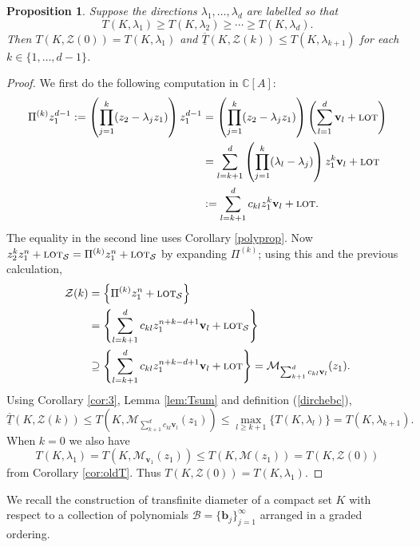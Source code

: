 \documentclass[12pt]{article}
\numberwithin{equation}{section}
\newtheorem{proposition}[theorem]{Proposition}
\newcommand{\C}{\mathbb{C}}
\newcommand{\calM}{\mathcal{M}}
\newcommand{\lot}{\text{\sc lot}}
\newcommand{\calZ}{\mathcal{Z}}
\newcommand{\calB}{\mathcal{B}}
\newcommand{\calS}{\mathcal{S}}
\newcommand{\bv}{\mathbf{v}}
\newcommand{\bb}{\mathbf{b}}
\begin{document}
\begin{proposition}\label{prop:TZ}
Suppose the directions $\lambda_1,\ldots,\lambda_d$ are labelled so that 
$$T(K,\lambda_1)\geq T(K,\lambda_2) \geq\cdots\geq T(K,\lambda_d) .$$ Then  %
$T(K,\calZ(0))=T(K,\lambda_1)$ and  $\overline{\underline T}(K,\calZ(k))\leq T(K,\lambda_{k+1})$ for each $k\in\{1,\ldots,d-1\}$.  
\end{proposition}


\begin{proof}
We first do the following computation in $ \C[A]$:
$$\begin{aligned}
\Pi^{(k)} z_1^{d-1}:=\left(\prod_{j=1}^{k} (z_2-\lambda_j z_1)\right)z_1^{d-1} &=
\left(\prod_{j=1}^{k} (z_2-\lambda_j z_1)\right) \left(\sum_{l=1}^d\bv_l +\lot \right) \\
 &= \sum_{l=k+1}^d \left(\prod_{j=1}^{k}(\lambda_l-\lambda_j)\right)z_1^{k}\bv_l +\lot \\
&:= \sum_{l=k+1}^d c_{kl}z_1^{k}\bv_l + \lot.
\end{aligned}$$
The equality in the second line uses Corollary \ref{polyprop}. 
Now $z_2^kz_1^n+\lot_{\calS} = \Pi^{(k)}z_1^n+\lot_{\calS}$ by expanding $\Pi^{(k)}$; using this and the previous calculation,
\begin{equation}\label{eqn:ap}
\begin{aligned}\calZ(k)&=\left\{ \Pi^{(k)}z_1^n+\lot_{\calS}\right\} \\ 
&= \left\{ \sum_{l=k+1}^d c_{kl}z_1^{n+k-d+1}\bv_l + \lot_{\calS} \right\}  \\
&\supseteq \left\{ \sum_{l=k+1}^d c_{kl}z_1^{n+k-d+1}\bv_l + \lot \right\} = \calM_{\sum_{k+1}^d c_{kl}\bv_l}(z_1).  \end{aligned}\end{equation} 
Using Corollary \ref{cor:3}, Lemma \ref{lem:Tsum} and definition (\ref{dirchebc}), 
$$\overline{\underline T}(K,\calZ(k))\leq T(K,\calM_{\sum_{k+1}^d c_{kl}\bv_l}(z_1))   \leq \max_{l\geq k+1}\{ T(K,\lambda_l)\} = T(K,\lambda_{k+1}).$$ 
When $k=0$ we also have  
$$
T(K,\lambda_1)=T(K,\calM_{\bv_1}(z_1))\leq T(K,\calM(z_1)) = T(K,\calZ(0))
$$
from Corollary \ref{cor:oldT}. Thus $T(K,\calZ(0)) =T(K,\lambda_1)$.
\end{proof}

We recall the construction of transfinite diameter of a compact set $K$ with respect 
to a collection of polynomials $\calB=\{\bb_j\}_{j=1}^{\infty}$ arranged in a graded ordering.  
\end{document}
